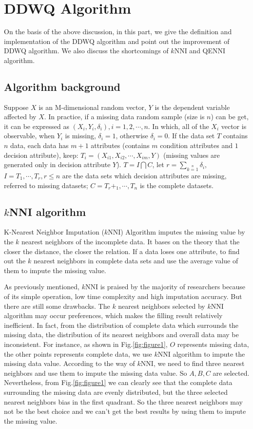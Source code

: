 \documentclass[print]{jicspack}
\begin{document}
\section{DDWQ Algorithm}
\label{sec:2.1}
On the basis of the above discussion, in this part, we give the definition and implementation of the DDWQ algorithm and point out the improvement of DDWQ algorithm. We also discuss the shortcomings of $k$NNI and QENNI algorithm.
\subsection{Algorithm background}
Suppose $X$ is an M-dimensional random vector, $Y$ is the dependent variable affected by $X$. In practice, if a missing data random sample (size is $n$) can be get, it can be expressed as $(X_i, Y_i, \delta_i), i= 1, 2,\cdots, n$. In which, all of the $X_i$ vector is observable, when $Y_i$ is missing, $\delta_i = 1$, otherwise $\delta_i = 0$. If the data set $T$ contains $n$ data, each data has $m + 1$ attributes (contains $m$ condition attributes and $1$ decision attribute), keep: $T_i = (X_{i1}, X_{i2}, \cdots, X_{im}, Y)$ (missing values are generated only in decision attribute $Y$). $T = I \bigcap C$, let $r = \sum\limits_{k=1}\limits^{n} \delta_i$, $I = {T_1, \cdots, T_r}, r \leq n$ are the data sets which decision attributes are missing, referred to missing datasets; $C = {T_r+_1, \cdots, T_n}$ is the complete datasets.
\subsection{$k$NNI algorithm}
\label{2.2}
K-Nearest Neighbor Imputation ($k$NNI) Algorithm imputes the missing value by the $k$ nearest neighbors of the incomplete data. It bases on the theory that the closer the distance, the closer the relation. If a data loses one attribute, to find out the $k$ nearest neighbors in complete data sets and use the average value of them to impute the missing value.

As previously mentioned, $k$NNI is praised by the majority of researchers because of its simple operation, low time complexity and high imputation accuracy. But there are still some drawbacks. The $k$ nearest neighbors selected by $k$NNI algorithm may occur preferences, which makes the filling result relatively inefficient. In fact, from the distribution of complete data which surrounds the missing data, the distribution of its nearest neighbors and overall data may be inconsistent. For instance, as shown in Fig.\ref{fig:figure1}, $O$ represents missing data, the other points represents complete data, we use $k$NNI algorithm to impute the missing data value. According to the way of $k$NNI, we need to find three nearest neighbors and use them to impute the missing data value. So $A, B, C$ are selected. Nevertheless, from Fig.\ref{fig:figure1} we can clearly see that the complete data surrounding the missing data are evenly distributed, but the three selected nearest neighbors bias in the first quadrant. So the three nearest neighbors may not be the best choice and we can't get the best results by using them to impute the missing value.
\end{document}
